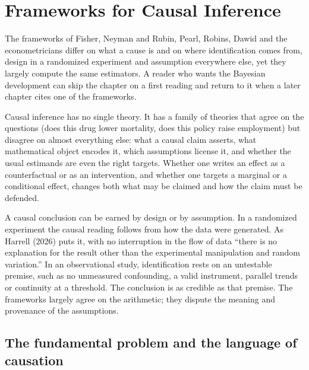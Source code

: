 \chapter{Frameworks for Causal Inference}\label{ch:frameworks}

\begin{tcolorbox}[colback=gray!6,colframe=gray!50,title=In brief,fonttitle=\normalfont\itshape,coltitle=black,colbacktitle=gray!15,boxrule=0.4pt,arc=1pt]
The frameworks of Fisher, Neyman and Rubin, Pearl, Robins, Dawid and the econometricians differ on what a cause is and on where identification comes from, design in a randomized experiment and assumption everywhere else, yet they largely compute the same estimators. A reader who wants the Bayesian development can skip the chapter on a first reading and return to it when a later chapter cites one of the frameworks.
\end{tcolorbox}

Causal inference has no single theory. It has a family of theories that agree on the questions (does this drug lower mortality, does this policy raise employment) but disagree on almost everything else: what a causal claim asserts, what mathematical object encodes it, which assumptions license it, and whether the usual estimands are even the right targets. Whether one writes an effect as a counterfactual or as an intervention, and whether one targets a marginal or a conditional effect, changes both what may be claimed and how the claim must be defended.

A causal conclusion can be earned by design or by assumption. In a randomized experiment the causal reading follows from how the data were generated. As Harrell (2026) puts it, with no interruption in the flow of data ``there is no explanation for the result other than the experimental manipulation and random variation.'' In an observational study, identification rests on an untestable premise, such as no unmeasured confounding, a valid instrument, parallel trends or continuity at a threshold. The conclusion is as credible as that premise. The frameworks largely agree on the arithmetic; they dispute the meaning and provenance of the assumptions.

\section[The fundamental problem]{The fundamental problem and the language of causation}\label{fw:sec:fundamental}

